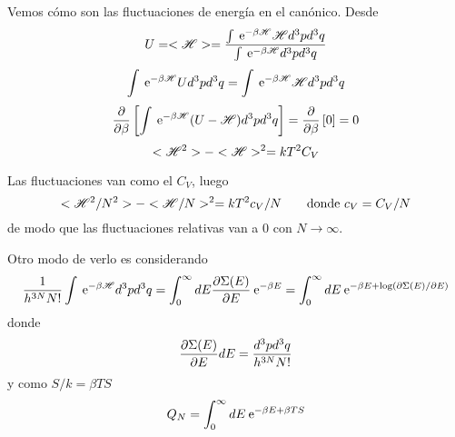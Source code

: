\documentclass[10pt,oneside]{CBFT_book}
\begin{document}
Vemos cómo son las fluctuaciones de energía en el canónico. Desde 
\[
	U = <\mathscr{H}> = \frac{\int \:\mathrm{e}^{-\beta\mathscr{H}} \mathscr{H} d^3p d^3q}{\int \:\mathrm{e}^{-\beta\mathscr{H}} d^3p d^3q}
\]
\[
	\int \:\mathrm{e}^{-\beta\mathscr{H}} U d^3p d^3q = \int \:\mathrm{e}^{-\beta\mathscr{H}} \mathscr{H} d^3p d^3q
\]
\[
	\frac{\partial^{\hspace{-0.05em}} {}}{\partial {\beta}^{\hspace{-0.05em}}}\left[ \int \:\mathrm{e}^{-\beta\mathscr{H}} (U-\mathscr{H}) d^3p d^3q\right] = \frac{\partial^{\hspace{-0.05em}} {}}{\partial {\beta}^{\hspace{-0.05em}}}\left[ 0 \right] = 0
\]
\[
	<\mathscr{H}^2> - <\mathscr{H}>^2 = kT^2C_V
\]

Las fluctuaciones van como el $C_V$, luego 
\[
	<\mathscr{H}^2/N^2> - <\mathscr{H}/N>^2 = kT^2c_V/N \qquad \text{donde } c_V = C_V/N
\]
de modo que las fluctuaciones relativas van a 0 con $N\to\infty$.

Otro modo de verlo es considerando 
\[
	\frac{1}{h^{3N}N!}\int \:\mathrm{e}^{-\beta\mathscr{H}} d^3p d^3q = \int_0^\infty dE \frac{\partial^{\hspace{-0.05em}} {\Sigma(E)}}{\partial {E}^{\hspace{-0.05em}}} \:\mathrm{e}^{-\beta E} =
	\int_0^\infty dE \:\mathrm{e}^{-\beta E + \log (\partial \Sigma(E)/\partial E)}
\]
donde 
\[
	\frac{\partial^{\hspace{-0.05em}} {\Sigma(E)}}{\partial {E}^{\hspace{-0.05em}}} dE = \frac{d^3p d^3q}{h^{3N}N!}
\]
y como $S/k = \beta TS$
\[
	Q_N = \int_0^\infty dE \:\mathrm{e}^{-\beta E + \beta T S }
\]

\end{document}
